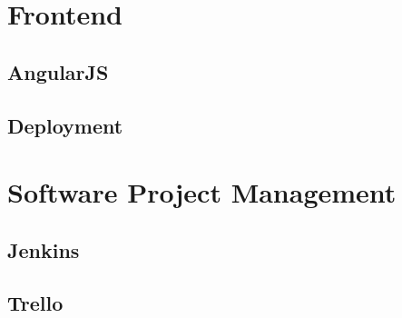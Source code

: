 \section{Frontend}
\subsection{AngularJS}
\subsection{Deployment}

\section{Software Project Management}
\subsection{Jenkins}
\subsection{Trello}